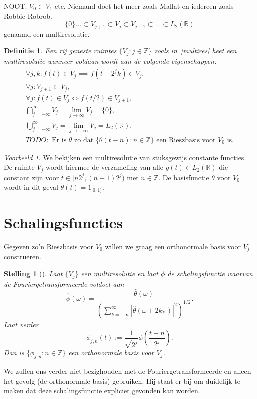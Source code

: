 \documentclass[11pt]{report}
\newcommand{\R}{\mathbb{R}}
\newcommand{\Z}{\mathbb{Z}}
\theoremstyle{plain}
\newtheorem*{stelling}{Stelling}
\newtheorem*{definitie}{Definitie}
\theoremstyle{remark}
\newtheorem*{voorbeeld}{Voorbeeld}
\begin{document}
NOOT: $V_0 \subset V_1$ etc. Niemand doet het meer zoals Mallat en iedereen zoals Robbie Robrob.
\begin{equation}
  \label{multires}
  \{0\} \ldots \subset V_{j+1} \subset V_j \subset V_{j-1} \subset \ldots \subset L_2(\R)
\end{equation}
genaamd een multiresolutie.
\begin{definitie}
Een rij geneste ruimtes $\{ V_j: j \in \Z \}$ zoals in~\ref{multires} heet een multiresolutie wanneer voldaan wordt aan de volgende eigenschappen:
\begin{eqnarray}
  \forall j, k: f(t) \in V_j \implies f(t - 2^j k) \in V_j, \\
  \forall j: V_{j+1} \subset V_j, \\
  \forall j: f(t) \in V_j \iff f(t/2) \in V_{j+1}, \\
  \bigcap_{j=-\infty}^{\infty} V_{j} = \lim_{j\to\infty} V_j = \{0\}, \\
  \bigcup_{j=-\infty}^{\infty} V_j = \lim_{j\to-\infty} V_j = L_2(\R), \\
  TODO: \text{ Er is $\theta$ zo dat $\{ \theta(t-n): n \in \Z \}$ een Rieszbasis voor $V_0$ is.}
\end{eqnarray}
\end{definitie}

\begin{voorbeeld} We bekijken een multiresolutie van stuksgewijs constante functies. De ruimte $V_j$ wordt hiermee de verzameling van alle $g(t) \in L_2(\R)$ die constant zijn voor $t \in [n 2^j, (n+1)2^j)$ met $n \in \Z$. De basisfunctie $\theta$ voor $V_0$ wordt in dit geval $\theta(t) = 1_{[0,1)}$. \end{voorbeeld}

\section{Schalingsfuncties}
Gegeven zo'n Rieszbasis voor $V_0$ willen we graag een orthonormale basis voor $V_j$ construeren. 
\begin{stelling}[{\cite[T7.1]{mallat}}] 
  Laat $\{ V_j \}$ een multiresolutie en laat $\phi$ de schalingsfunctie waarvan de Fouriergetransformeerde voldoet aan
  \[
    \hat{\phi}(\omega) = \frac{\hat{\theta}(\omega)}{\left( \sum_{k=-\infty}^\infty | \hat{\theta}(\omega + 2k \pi) |^2 \right)^{1/2}}.
  \]
  Laat verder
  \[
    \phi_{j,n}(t) := \frac{1}{\sqrt{2^j}} \phi\left( \frac{t-n}{2^j} \right).
  \]
  Dan is $\{ \phi_{j,n}: n \in \Z \}$ een orthonormale basis voor $V_j$.
\end{stelling}
We zullen ons verder niet bezighouden met de Fouriergetransformeerde en alleen het gevolg (de orthonormale basis) gebruiken. Hij staat er bij om duidelijk te maken dat deze schalingsfunctie expliciet gevonden kan worden.
\end{document}
